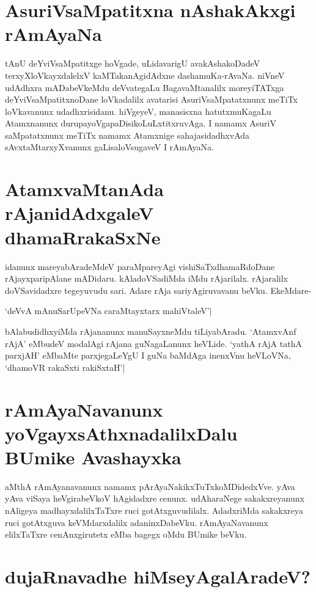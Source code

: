 \section*{AsuriVsaMpatitxna nAshakAkxgi rAmAyaNa}

tAnU deYviVsaMpatitxge hoVgade, uLidavarigU avakAshakoDadeV terxyXloVkayxdalelxV kaMTakanAgidAdxne dashamuKa-rAvaNa. niVneV udAdhxra mADabeVkeMdu deVvategaLu BagavaMtanalilx moreyiTATxga deYviVsaMpatitxnoDane loVkadalilx avatarisi AsuriVsaMpatatxnunx meTiTx loVkavanunx udadhxrisidanu. hiVgeyeV, manasisxna hatutxmuKagaLu Atamxnanunx durupayoVgapaDisikoLuLxtitxruvAga. I namamx AsuriV saMpatatxnunx meTiTx namamx Atamxnige sahajasidadhxvAda sAvxtaMtarxyXvanunx gaLisaloVsugaveV I rAmAyaNa.

\section*{AtamxvaMtanAda rAjanidAdxgaleV dhamaRrakaSxNe}

idanunx mareyabAradeMdeV paraMpareyAgi vishiSaTxdhamaRdoDane rAjayxparipAlane mADidaru. kAladoVSadiMda iMdu rAjarilalx. rAjaralilx doVSavidadxre tegeyuvudu sari. Adare rAja sariyAgiruvavanu beVku. EkeMdare-

\begin{shloka}
`deVvA mAnuSarUpeVNa caraMtayxtarx mahiVtaleV'|\label{225b}
\end{shloka}

bAlabudidhxyiMda rAjananunx manuSayxneMdu tiLiyabAradu. `AtamxvAnf rAjA' eMbudeV modalAgi rAjana guNagaLanunx heVLide. `yathA rAjA tathA parxjAH'\label{225c} eMbaMte parxjegaLeYgU I guNa baMdAga inenxVnu heVLoVNa, `dhamoVR rakaSxti rakiSxtaH'|\label{225}

\section*{rAmAyaNavanunx yoVgayxsAthxnadalilxDalu BUmike Avashayxka}

aMthA rAmAyanavanunx namamx pArAyaNakikxTuTxkoMDidedxVve. yAva yAva viSaya heVgirabeVkoV hAgidadxre cenunx. udAharaNege sakakxreyanunx nAligeya madhayxdalilxTaTxre ruci gotAtxguvudilalx. AdadxriMda sakakxreya ruci gotAtxguva keVMdarxdalilx adaninxDabeVku. rAmAyaNavanunx elilxTaTxre cenAnxgirutetx eMba bagegx oMdu BUmike beVku.

\section*{dujaRnavadhe hiMseyAgalAradeV?}


